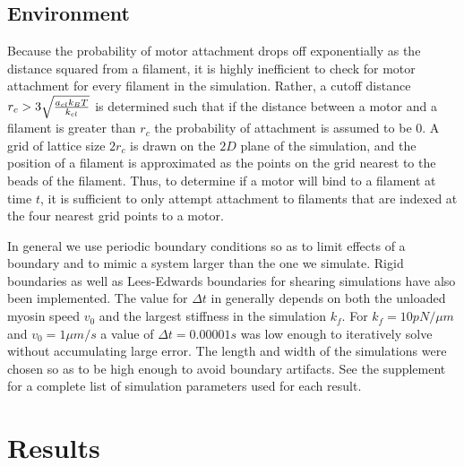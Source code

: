 \documentclass[12pt]{article}
\begin{document}
\subsection{Environment}
\par
Because the probability of motor attachment drops off exponentially as the distance squared from a filament, it is
highly inefficient to check for motor attachment for every filament in the simulation. Rather, a cutoff distance
$r_c>3\sqrt{a_{cl} k_B T\over k_{cl}}$ 
is determined such that if the distance between a motor and a filament is greater than $r_c$ the probability of
attachment is assumed to be $0$. A grid of lattice size $2r_c$ is drawn on the
$2D$ plane of the simulation, and the position of a filament is approximated as the points on the grid nearest to the
beads of the filament. Thus, to determine if a motor will bind to a filament at time $t$, it is sufficient to
only attempt attachment to filaments that are indexed at the four nearest grid points to a motor. 
\par
In general we use periodic boundary conditions so as to limit effects of a boundary and to mimic a system larger than
the one we simulate. Rigid boundaries as well as Lees-Edwards boundaries for shearing simulations have also been
implemented. The value for $\Delta t$ in  generally depends on both the unloaded myosin speed
$v_0$ and the largest stiffness in the simulation $k_f$. For $k_f = 10pN/\mu m$ and $v_0=1\mu m/s$ a value of $\Delta t =
0.00001 s$ was low enough to iteratively solve  without accumulating large error. 
The length and width of the simulations were chosen so as to be high enough to avoid boundary artifacts. 
See the supplement for a complete list of simulation parameters used for each result.
\section{Results}
\end{document}
